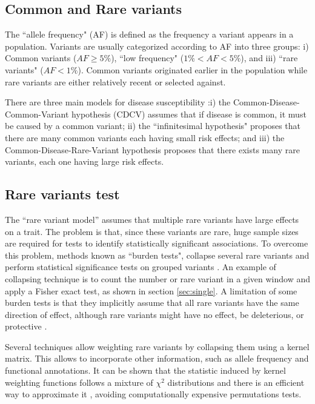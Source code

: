 \subsection{Common and Rare variants\label{sec:comonrare}}

The ``allele frequency" (AF) is defined as the frequency a variant appears in a population. Variants are usually categorized according to AF into three groups: i) Common variants ($AF \geq 5\%$), ``low frequency" ($1\% < AF < 5\%$), and iii) ``rare variants" ($AF < 1\%$). Common variants originated earlier in the population while rare variants are either relatively recent or selected against.

There are three main models for disease susceptibility  \cite{hartl1997principles, gibson2012rare}:i) the Common-Disease-Common-Variant hypothesis (CDCV) assumes that if disease is common, it must be caused by a common variant; ii) the ``infinitesimal hypothesis" proposes that there are many common variants each having small risk effects; and iii) the Common-Disease-Rare-Variant hypothesis proposes that there exists many rare variants, each one having large risk effects.

\subsection{Rare variants test}

The ``rare variant model'' assumes that multiple rare variants have large effects on a trait. The problem is that, since these variants are rare, huge sample sizes are required for tests to identify statistically significant associations. To overcome this problem, methods known as ``burden tests", collapse several rare variants and perform statistical significance tests on grouped variants \cite{li2008methods}. An example of collapsing technique is to count the number or rare variant in a given window and apply a Fisher exact test, as shown in section \ref{sec:single}. A limitation of some burden tests is that they implicitly assume that all rare variants have the same direction of effect, although rare variants might have no effect, be deleterious, or protective \cite{li2008methods,wu2011rare}.

Several techniques allow weighting rare variants by collapsing them using a kernel matrix. This allows to incorporate other information, such as allele frequency and functional annotations. It can be shown that the statistic induced by kernel weighting functions follows a mixture of $\chi^2$ distributions and there is an efficient way to approximate it \cite{li2008methods,wu2011rare}, avoiding computationally expensive permutations tests.

